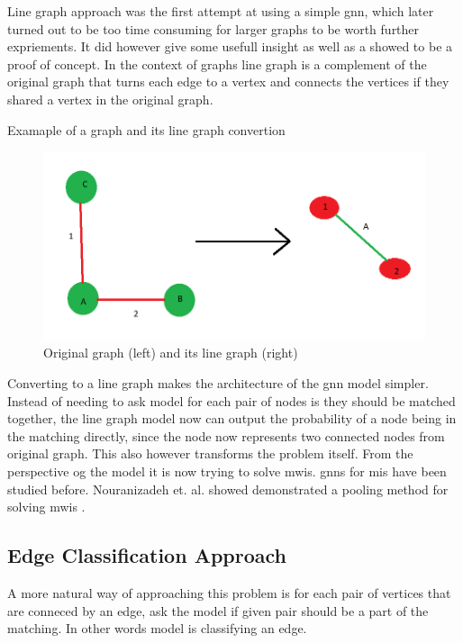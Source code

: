 Line graph approach was the first attempt at using a simple \gls{gnn}, which later turned out to be too time consuming for larger graphs to be worth further expriements. It did however give some usefull insight as well as a showed to be a proof of concept. In the context of graphs line graph is a complement of the original graph that turns each edge to a vertex and connects the vertices if they shared a vertex in the original graph. 

Examaple of a graph and its line graph convertion
\begin{figure}[H]
    \centering
    \includegraphics[scale=0.5]{figures/LineGraphExample}
    \caption{Original graph (left) and its line graph (right)}
    \label{Line graph figure}
\end{figure}

Converting to a line graph makes the architecture of the \gls{gnn} model simpler. Instead of needing to ask model for each pair of nodes is they should be matched together, the line graph model now can output the probability of a node being in the matching directly, since the node now represents two connected nodes from original graph. This also however transforms the problem itself. From the perspective og the model it is now trying to solve \gls{mwis}. \gls{gnn}s for \gls{mis} have been studied before. Nouranizadeh et. al. showed demonstrated a pooling method for solving \gls{mwis} \cite{DBLPjournals/corr/abs-2107-01410}.

\subsection{Edge Classification Approach}

A more natural way of approaching this problem is for each pair of vertices that are conneced by an edge, ask the model if given pair should be a part of the matching. In other words model is classifying an edge. 

